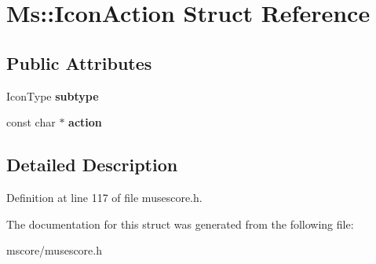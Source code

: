 \hypertarget{struct_ms_1_1_icon_action}{}\section{Ms\+:\+:Icon\+Action Struct Reference}
\label{struct_ms_1_1_icon_action}
\subsection*{Public Attributes}
\begin{DoxyCompactItemize}
\item 
\mbox{\label{struct_ms_1_1_icon_action_af678b0e35bfdf17b6916093c392d9848}} 
Icon\+Type {\bfseries subtype}
\item 
\mbox{\label{struct_ms_1_1_icon_action_a86fa1ecb7a4f195375bf04b2d78d4c1c}} 
const char $\ast$ {\bfseries action}
\end{DoxyCompactItemize}


\subsection{Detailed Description}


Definition at line 117 of file musescore.\+h.



The documentation for this struct was generated from the following file\+:\begin{DoxyCompactItemize}
\item 
mscore/musescore.\+h\end{DoxyCompactItemize}
